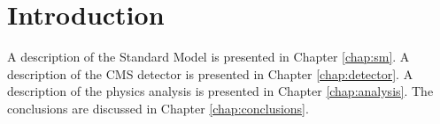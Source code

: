 \chapter{Introduction}

A description of the Standard Model is presented in Chapter \ref{chap:sm}. A description of the CMS detector is presented in Chapter \ref{chap:detector}. A description of the physics analysis is presented in Chapter \ref{chap:analysis}. The conclusions are discussed in Chapter \ref{chap:conclusions}.
